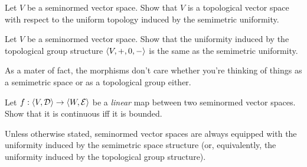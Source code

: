 \begin{exr}
Let $V$ be a seminormed vector space.  Show that $V$ is a topological vector space with respect to the uniform topology induced by the semimetric uniformity.
\end{exr}
\begin{exr}
Let $V$ be a seminormed vector space.  Show that the uniformity induced by the topological group structure $\langle V,+,0,-\rangle$ is the same as the semimetric uniformity.
\end{exr}
As a mater of fact, the morphisms don't care whether you're thinking of things as a semimetric space or as a topological group either.
\begin{exr}\label{exr4.3.57}
Let $f:\langle V,\mathcal{D}\rangle\rightarrow \langle W,\mathcal{E}\rangle$ be a \emph{linear} map between two seminormed vector spaces.  Show that it is continuous iff it is bounded.
\end{exr}
\begin{textequation}
Unless otherwise stated, seminormed vector spaces are always equipped with the uniformity induced by the semimetric space structure (or, equivalently, the uniformity induced by the topological group structure).
\end{textequation}

